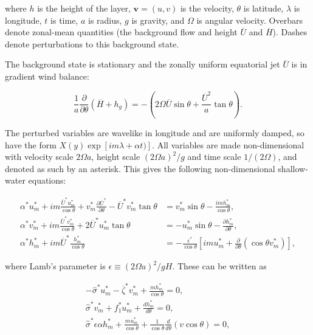  where $h$ is the height of the layer, $\boldsymbol{v} = (u,v)$ is the velocity, $\theta$ is latitude, $\lambda$ is longitude, $t$ is time, $a$ is radius, $g$ is gravity, and $\Omega$ is angular velocity. Overbars denote zonal-mean quantities (the background flow and height $\overline{U}$ and $\overline{H}$). Dashes denote perturbations to this background state.

 The background state is stationary and the zonally uniform equatorial jet $\overline{U}$ is in gradient wind balance:

 \begin{equation}
   \frac{1}{a} \frac{\partial}{\partial \theta}\left(\overline{H}+h_{g}\right)=-\left(2 \Omega \overline{U} \sin \theta+\frac{\overline{U}^{2}}{a} \tan \theta\right).
 \end{equation}

 The perturbed variables are wavelike in longitude and are uniformly damped, so have the form $X(y) \exp [i m \lambda+\alpha t)]$. All variables are made non-dimensional with velocity scale $2 \Omega a$, height scale $(2 \Omega a)^{2}/g$ and time scale $1/(2\Omega)$, and denoted as such by an asterisk. This gives the following non-dimensional shallow-water equations:

 \begin{equation}
   \begin{aligned}
     \alpha^{*} u_{m}^{*}+i m \frac{\overline{U}^{*} u_{m}^{*}}{\cos \theta}+v_{m}^{*} \frac{\partial \overline{U}^{*}}{\partial \theta}-\overline{U}^{*} v_{m}^{*} \tan \theta &=v_{m}^{*} \sin \theta-\frac{i m h_{m}^{*}}{\cos \theta}, \\
     \alpha^{*} v_{m}^{*}+i m \frac{\overline{U}^{*} v_{m}^{*}}{\cos \theta}+2 \overline{U}^{*} u_{m}^{*} \tan \theta &=-u_{m}^{*} \sin \theta-\frac{\partial h_{m}^{*}}{\partial \theta}, \\
     \alpha^{*} h_{m}^{*}+i m \overline{U}^{*} \frac{h_{m}^{*}}{\cos \theta} &=-\frac{\epsilon^{*}}{\cos \theta}\left[i m u_{m}^{*}+\frac{\partial}{\partial \theta}\left(\cos \theta v_{m}^{*}\right)\right],
   \end{aligned}
 \end{equation}

 where Lamb's parameter is $\epsilon \equiv(2 \Omega a)^{2} / g H$. These can be written as

 \begin{equation}
   \begin{aligned}
     - \hat{\sigma}^{*} u_{m}^{*} - \overline{\zeta}^{*}v_{m}^{*} + \frac{m h_{m}^{*} }{\cos \theta} = 0, \\
     \hat{\sigma}^{*}  v_{m}^{*} + f_{1}^{*}u_{m}^{*} + \frac{d h_{m}^{*}}{d \theta} = 0, \\
     \hat{\sigma}^{*}  \epsilon \alpha h_{m}^{*}+ \frac{m u_{m}^{*}}{\cos \theta} + \frac{1}{\cos \theta} \frac{d}{d \theta}(v \cos \theta) = 0,
   \end{aligned}
 \end{equation}

